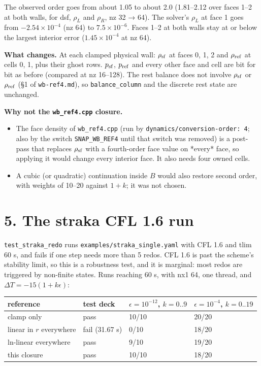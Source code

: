 \documentclass[11pt,a4paper]{article}
\begin{document}
The observed order goes from about 1.05 to about 2.0 (1.81–2.12 over faces 1–2 at both walls, for dsf,
$\rho_L$ and $\rho_R$, nz 32 → 64). The solver's $\rho_L$ at face 1 goes from $-2.54\times10^{-4}$ (nz 64) to
$7.5\times10^{-6}$. Faces 1–2 at both walls stay at or below the largest interior error ($1.45\times10^{-4}$ at
nz 64).

\textbf{What changes.} At each clamped physical wall: $\rho_{\rm sf}$ at faces 0, 1, 2 and $\rho_{\rm ref}$ at cells 0, 1,
plus their ghost rows. $p_{\rm sf}$, $p_{\rm ref}$ and every other face and cell are bit for bit as before
(compared at nz 16–128). The rest balance does not involve $\rho_{\rm sf}$ or $\rho_{\rm ref}$ (§1 of
\texttt{wb-ref4.md}), so \texttt{balance\_column} and the discrete rest state are unchanged.

\textbf{Why not the \texttt{wb\_ref4.cpp} closure.}
\begin{itemize}
\item The face density of \texttt{wb\_ref4.cpp} (run by \texttt{dynamics/conversion-order: 4}; also by the switch \texttt{SNAP\_WB\_REF4}
  until that switch was removed) is a post-pass that replaces $\rho_{\rm sf}$ with a fourth-order face value on
  *every* face, so applying it would change every interior face. It also needs four owned cells.
\item A cubic (or quadratic) continuation inside $B$ would also restore second order, with weights of 10–20 against
  $1+k$; it was not chosen.
\end{itemize}

\section*{5. The straka CFL 1.6 run}

\texttt{test\_straka\_redo} runs \texttt{examples/straka\_single.yaml} with CFL 1.6 and tlim 60 s, and fails if one step needs more
than 5 redos. CFL 1.6 is past the scheme's stability limit, so this is a robustness test, and it is marginal: most
redos are triggered by non-finite states. Runs reaching 60 s, with nx1 64, one thread, and
$\Delta T = -15(1 + k\epsilon)$:

\begin{longtable}{llll}
\toprule
reference & test deck & $\epsilon = 10^{-12}$, $k = 0..9$ & $\epsilon = 10^{-4}$, $k = 0..19$ \\
\midrule
clamp only & pass & 10/10 & 20/20 \\
linear in $r$ everywhere & fail (31.67 s) & 0/10 & 18/20 \\
ln-linear everywhere & pass & 9/10 & 19/20 \\
this closure & pass & 10/10 & 18/20 \\
\bottomrule
\end{longtable}
\end{document}
